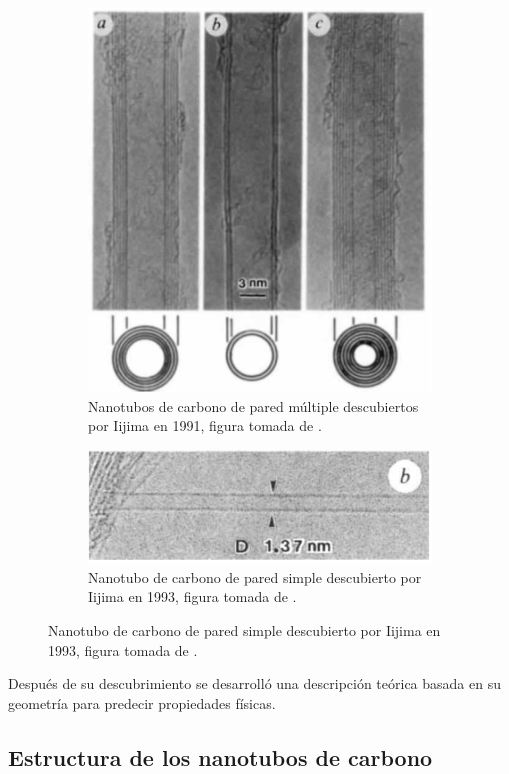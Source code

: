 \begin{figure}[!hbt]
\begin{subfigure}{.5\textwidth}
  \centering
  \includegraphics[width=.6\linewidth]{CNT/MWCNTiijima1991.png}  
  \caption{Nanotubos de carbono de pared múltiple descubiertos por Iijima en 1991, figura tomada de \cite{Iijima1991}.}
  \label{fig:iijima1991}
\end{subfigure}
\begin{subfigure}{.5\textwidth}
  \centering
  \includegraphics[width=.7\linewidth]{CNT/SWCNTiijima1993.png}  
  \caption{Nanotubo de carbono de pared simple descubierto por Iijima en 1993, figura tomada de \cite{Iijima1993}.}
  \label{fig:iijima1993}
\end{subfigure}
\end{figure}

\newpage

Después de su descubrimiento se desarrolló una descripción teórica basada en su geometría para predecir propiedades físicas.

\subsection{Estructura de los nanotubos de carbono}\label{teoriaCNT}

